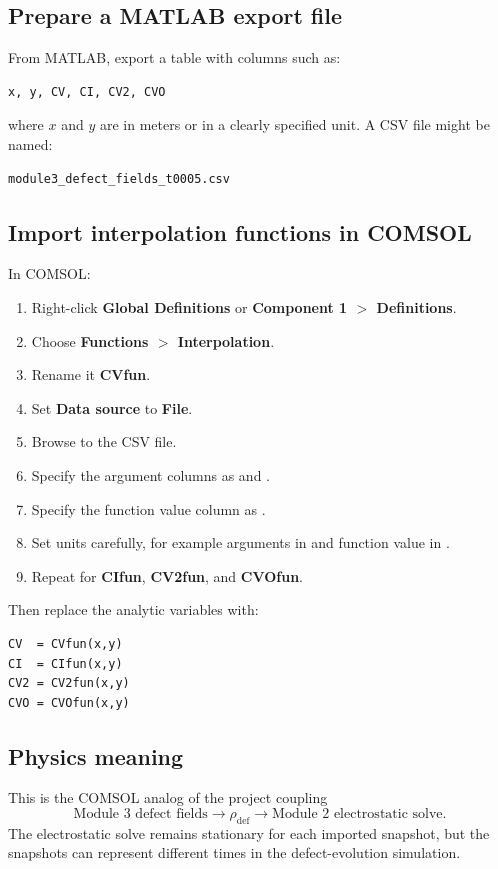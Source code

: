 \documentclass[11pt]{article}
\newcommand{\code}[1]{\texttt{\detokenize{#1}}}
\begin{document}
\subsection{Prepare a MATLAB export file}

From MATLAB, export a table with columns such as:
\begin{verbatim}
x, y, CV, CI, CV2, CVO
\end{verbatim}
where $x$ and $y$ are in meters or in a clearly specified unit. A CSV file might be named:
\begin{verbatim}
module3_defect_fields_t0005.csv
\end{verbatim}

\subsection{Import interpolation functions in COMSOL}

In COMSOL:
\begin{enumerate}[leftmargin=2em]
\item Right-click \textbf{Global Definitions} or \textbf{Component 1 $>$ Definitions}.
\item Choose \textbf{Functions $>$ Interpolation}.
\item Rename it \textbf{CVfun}.
\item Set \textbf{Data source} to \textbf{File}.
\item Browse to the CSV file.
\item Specify the argument columns as \code{x} and \code{y}.
\item Specify the function value column as \code{CV}.
\item Set units carefully, for example arguments in \code{m} and function value in \code{1/m^3}.
\item Repeat for \textbf{CIfun}, \textbf{CV2fun}, and \textbf{CVOfun}.
\end{enumerate}

Then replace the analytic variables with:
\begin{verbatim}
CV  = CVfun(x,y)
CI  = CIfun(x,y)
CV2 = CV2fun(x,y)
CVO = CVOfun(x,y)
\end{verbatim}

\subsection{Physics meaning}

This is the COMSOL analog of the project coupling
\begin{equation}
\text{Module 3 defect fields}\rightarrow \rho_{\mathrm{def}}\rightarrow \text{Module 2 electrostatic solve}.
\end{equation}
The electrostatic solve remains stationary for each imported snapshot, but the snapshots can represent different times in the defect-evolution simulation.
\end{document}

